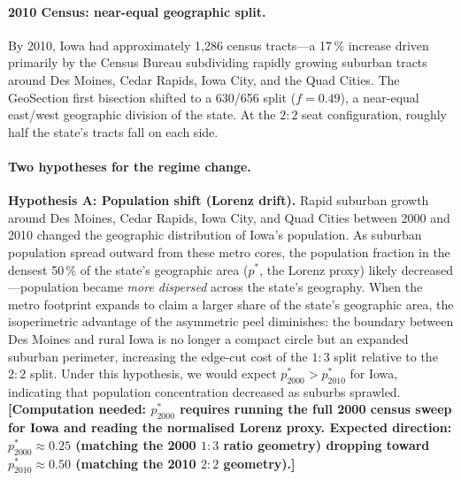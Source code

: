 \paragraph{2010 Census: near-equal geographic split.}
By 2010, Iowa had approximately 1{,}286 census tracts---a 17\,\% increase
driven primarily by the Census Bureau subdividing rapidly growing suburban
tracts around Des Moines, Cedar Rapids, Iowa City, and the Quad Cities.
The GeoSection first bisection shifted to a 630/656 split ($f = 0.49$),
a near-equal east/west geographic division of the state.
At the $2:2$ seat configuration, roughly half the state's tracts fall on
each side.

\paragraph{Two hypotheses for the regime change.}

\textbf{Hypothesis A: Population shift (Lorenz drift).}
Rapid suburban growth around Des Moines, Cedar Rapids, Iowa City, and Quad
Cities between 2000 and 2010 changed the geographic distribution of Iowa's
population.
As suburban population spread outward from these metro cores, the population
fraction in the densest 50\,\% of the state's geographic area
($p^*$, the Lorenz proxy) likely decreased---population became \emph{more
dispersed} across the state's geography.
When the metro footprint expands to claim a larger share of the state's
geographic area, the isoperimetric advantage of the asymmetric peel diminishes:
the boundary between Des Moines and rural Iowa is no longer a compact circle
but an expanded suburban perimeter, increasing the edge-cut cost of the $1:3$
split relative to the $2:2$ split.
Under this hypothesis, we would expect $p^*_{2000} > p^*_{2010}$ for Iowa,
indicating that population concentration decreased as suburbs sprawled.
\textbf{[Computation needed: $p^*_{2000}$ requires running the full 2000
census sweep for Iowa and reading the normalised Lorenz proxy.
Expected direction: $p^*_{2000} \approx 0.25$ (matching the 2000 $1:3$ ratio
geometry) dropping toward $p^*_{2010} \approx 0.50$ (matching the 2010 $2:2$
geometry).]}

